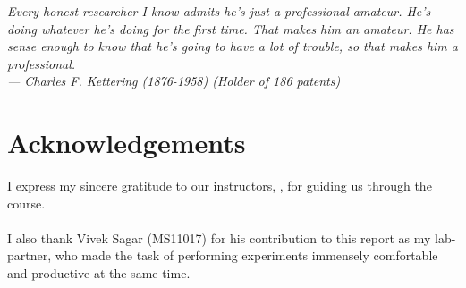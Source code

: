 
\begin{flushright}{\slshape    
Every honest researcher I know admits he's just a professional amateur.
He's doing whatever he's doing for the first time. That makes him an amateur.
He has sense enough to know that he's going to have a lot of trouble,
so that makes him a professional.\\ \medskip
--- Charles F. Kettering (1876-1958) (Holder of 186 patents)}
\end{flushright}



\bigskip

\begingroup
\let\clearpage\relax
\let\cleardoublepage\relax
\let\cleardoublepage\relax
\chapter*{Acknowledgements}
I express my sincere gratitude to our instructors, \myProf, for guiding us through the course.\\
 \\
I also thank Vivek Sagar (MS11017) for his contribution to this report as my lab-partner, who made the task of performing experiments immensely comfortable and productive at the same time.\\
\bigskip


\endgroup



